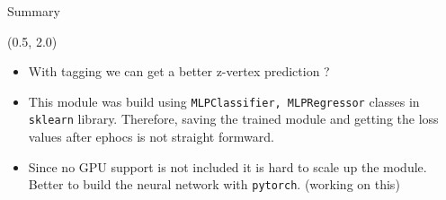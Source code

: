 \documentclass[12pt, xcolor={dvipsnames}, aspectratio = 169]{beamer}
\begin{document}
\begin{frame}[fragile]{Summary}

\begin{textblock}{14.0}(0.5, 2.0)
    \begin{itemize}
        \item With tagging we can get a better z-vertex prediction ?
        \item This module was build using \verb|MLPClassifier, MLPRegressor| classes in \verb|sklearn| library. Therefore, saving the trained module and getting the loss values after ephocs is not straight formward.
        \item Since no GPU support is not included it is hard to scale up the module. Better to build the neural network with \verb|pytorch|. (working on this)
    \end{itemize}
\end{textblock}

\end{frame}
\end{document}
